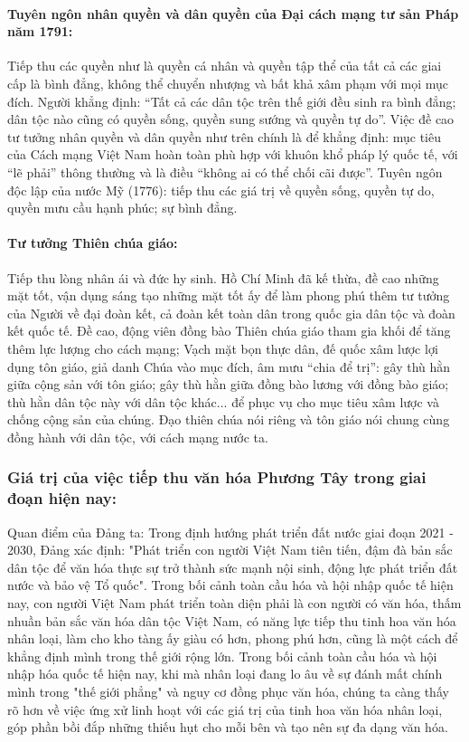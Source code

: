 \paragraph{Tuyên ngôn nhân quyền và dân quyền của Đại cách mạng tư sản Pháp năm 1791:}
Tiếp thu các quyền như là quyền cá nhân và quyền tập thể của tất cả các giai cấp là bình đẳng, không thể chuyển nhượng và bất khả xâm phạm với mọi mục đích. Người khẳng định: “Tất cả các dân tộc trên thế giới đều sinh ra bình đẳng; dân tộc nào cũng có quyền sống, quyền sung sướng và quyền tự do”. Việc đề cao tư tưởng nhân quyền và dân quyền như trên chính là để khẳng định: mục tiêu của Cách mạng Việt Nam hoàn toàn phù hợp với khuôn khổ pháp lý quốc tế, với “lẽ phải” thông thường và là điều “không ai có thể chối cãi được”.
Tuyên ngôn độc lập của nước Mỹ (1776): tiếp thu các giá trị về quyền sống, quyền tự do, quyền mưu cầu hạnh phúc;
sự bình đẳng.

\paragraph{Tư tưởng Thiên chúa giáo:}
Tiếp thu lòng nhân ái và đức hy sinh. Hồ Chí Minh đã kế thừa, đề cao những mặt tốt, vận dụng sáng tạo những mặt tốt ấy để làm phong phú thêm tư tưởng của Người về đại đoàn kết, cả đoàn kết toàn dân trong quốc gia dân tộc và đoàn kết quốc tế. Đề cao, động viên đồng bào Thiên chúa giáo tham gia khối để tăng thêm lực lượng cho cách mạng; Vạch mặt bọn thực dân, đế quốc xâm lược lợi dụng tôn giáo, giả danh Chúa vào mục đích, âm mưu “chia để trị”: gây thù hằn giữa cộng sản với tôn giáo; gây thù hằn giữa đồng bào lương với đồng bào giáo; thù hằn dân tộc này với dân tộc khác... để phục vụ cho mục tiêu xâm lược và chống cộng sản của chúng. Đạo thiên chúa nói riêng và tôn giáo nói chung cùng đồng hành với dân tộc, với cách mạng nước ta.

\subsubsection{Giá trị của việc tiếp thu văn hóa Phương Tây trong giai đoạn hiện nay:}

Quan điểm của Đảng ta: Trong định hướng phát triển đất nước giai đoạn 2021 - 2030, Đảng xác định: "Phát triển con người Việt Nam tiên tiến, đậm đà bản sắc dân tộc để văn hóa thực sự trở thành sức mạnh nội sinh, động lực phát triển đất nước và bảo vệ Tổ quốc". Trong bối cảnh toàn cầu hóa và hội nhập quốc tế hiện nay, con người Việt Nam phát triển toàn diện phải là con người có văn hóa, thấm nhuần bản sắc văn hóa dân tộc Việt Nam, có năng lực tiếp thu tinh hoa văn hóa nhân loại, làm cho kho tàng ấy giàu có hơn, phong phú hơn, cũng là một cách để khẳng định mình trong thế giới rộng lớn. Trong bối cảnh toàn cầu hóa và hội nhập hóa quốc tế hiện nay, khi mà nhân loại đang lo âu về sự đánh mất chính mình trong "thế giới phẳng" và nguy cơ đồng phục văn hóa, chúng ta càng thấy rõ hơn về việc ứng xử linh hoạt với các giá trị của tinh hoa văn hóa nhân loại, góp phần bồi đắp những thiếu hụt cho mỗi bên và tạo nên sự đa dạng văn hóa.

